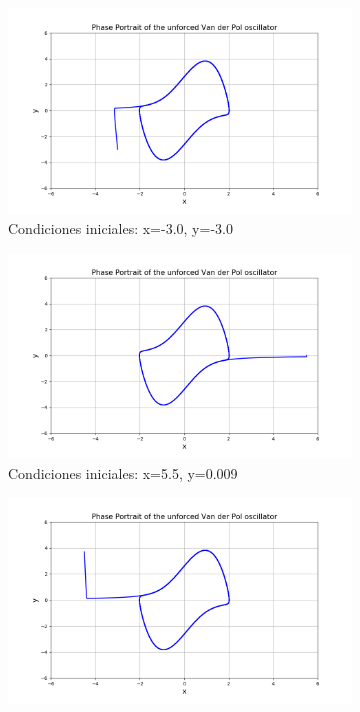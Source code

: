 \documentclass[12pt]{article}
\begin{document}
\begin{figure}[h!]
\begin{subfigure}{.55\textwidth}
\centering
\includegraphics[width=1\linewidth]{CI1.png}
\caption{Condiciones iniciales: x=-3.0, y=-3.0}
\end{subfigure}
\begin{subfigure}{.55\textwidth}
\centering
\includegraphics[width=1\linewidth]{CI2.png}
\caption{Condiciones iniciales: x=5.5, y=0.009}
\end{subfigure}
\begin{subfigure}{.55\textwidth}
\centering
\includegraphics[width=1\linewidth]{CI3.png}

\end{subfigure}
\end{figure}
\end{document}
